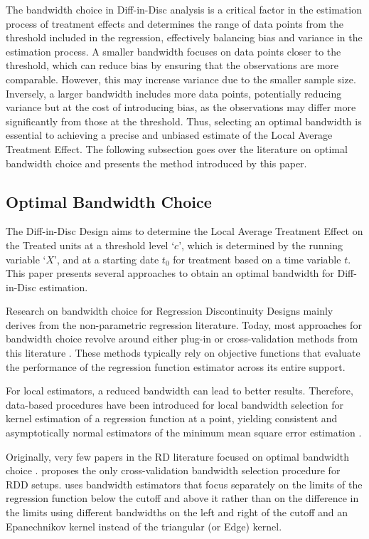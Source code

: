 \documentclass[12pt]{article}
\theoremstyle{plain}
\theoremstyle{remark}
\begin{document}
The bandwidth choice in Diff-in-Disc analysis is a critical factor in the estimation process of treatment effects and determines the range of data points from the threshold included in the regression, effectively balancing bias and variance in the estimation process. A smaller bandwidth focuses on data points closer to the threshold, which can reduce bias by ensuring that the observations are more comparable. However, this may increase variance due to the smaller sample size. Inversely, a larger bandwidth includes more data points, potentially reducing variance but at the cost of introducing bias, as the observations may differ more significantly from those at the threshold. Thus, selecting an optimal bandwidth is essential to achieving a precise and unbiased estimate of the Local Average Treatment Effect. The following subsection goes over the literature on optimal bandwidth choice and presents the method introduced by this paper.

\subsection{Optimal Bandwidth Choice}

The Diff-in-Disc Design aims to determine the Local Average Treatment Effect on the Treated units at a threshold level ‘$c$’, which is determined by the running variable ‘$X$’, and at a starting date $t_0$ for treatment based on a time variable $t$. This paper presents several approaches to obtain an optimal bandwidth for Diff-in-Disc estimation.

Research on bandwidth choice for Regression Discontinuity Designs mainly derives from the non-parametric regression literature. Today, most approaches for bandwidth choice revolve around either plug-in or cross-validation methods from this literature \parencite{Fan1992Gijbels, Hardle1992, Wand1994}. These methods typically rely on objective functions that evaluate the performance of the regression function estimator across its entire support.

For local estimators, a reduced bandwidth can lead to better results. Therefore, data-based procedures have been introduced for local bandwidth selection for kernel estimation of a regression function at a point, yielding consistent and asymptotically normal estimators of the minimum mean square error estimation \parencite{Brockmann1993Locally, Schucany1995Adaptive}.

Originally, very few papers in the RD literature focused on optimal bandwidth choice \parencite{Ludwig2007,DesJardins2008}. \cite{Ludwig2007} proposes the only cross-validation bandwidth selection procedure for RDD setups. \cite{DesJardins2008} uses bandwidth estimators that focus separately on the limits of the regression function below the cutoff and above it rather than on the difference in the limits using different bandwidths on the left and right of the cutoff and an Epanechnikov kernel instead of the triangular (or Edge) kernel.
\end{document}
